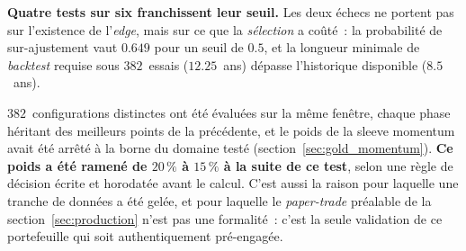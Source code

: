 \begin{thesisbox}
\textbf{Quatre tests sur six franchissent leur seuil.} Les deux échecs ne portent pas sur l'existence de l'\emph{edge}, mais sur ce que la \emph{sélection} a coûté~: la probabilité de sur-ajustement vaut $0.649$ pour un seuil de $0.5$, et la longueur minimale de \emph{backtest} requise sous $382$~essais ($12.25$~ans) dépasse l'historique disponible ($8.5$~ans).

$382$~configurations distinctes ont été évaluées sur la même fenêtre, chaque phase héritant des meilleurs points de la précédente, et le poids de la sleeve momentum avait été arrêté à la borne du domaine testé (section~\ref{sec:gold_momentum}). \textbf{Ce poids a été ramené de $20\,\%$ à $15\,\%$ à la suite de ce test}, selon une règle de décision écrite et horodatée avant le calcul. C'est aussi la raison pour laquelle une tranche de données a été gelée, et pour laquelle le \emph{paper-trade} préalable de la section~\ref{sec:production} n'est pas une formalité~: c'est la seule validation de ce portefeuille qui soit authentiquement pré-engagée.
\end{thesisbox}
